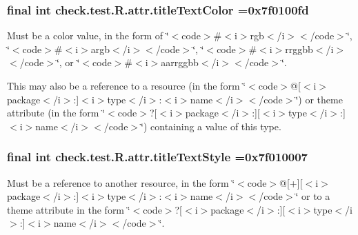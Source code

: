 \subsubsection[{title\+Text\+Color}]{\setlength{\rightskip}{0pt plus 5cm}final int check.\+test.\+R.\+attr.\+title\+Text\+Color =0x7f0100fd\hspace{0.3cm}{\ttfamily [static]}}\label{classcheck_1_1test_1_1_r_1_1attr_a05900c2c0b61d120064a083c8e2fcc8b}
Must be a color value, in the form of \char`\"{}$<$code$>$\#$<$i$>$rgb$<$/i$>$$<$/code$>$\char`\"{}, \char`\"{}$<$code$>$\#$<$i$>$argb$<$/i$>$$<$/code$>$\char`\"{}, \char`\"{}$<$code$>$\#$<$i$>$rrggbb$<$/i$>$$<$/code$>$\char`\"{}, or \char`\"{}$<$code$>$\#$<$i$>$aarrggbb$<$/i$>$$<$/code$>$\char`\"{}. 

This may also be a reference to a resource (in the form \char`\"{}$<$code$>$@\mbox{[}$<$i$>$package$<$/i$>$\+:\mbox{]}$<$i$>$type$<$/i$>$\+:$<$i$>$name$<$/i$>$$<$/code$>$\char`\"{}) or theme attribute (in the form \char`\"{}$<$code$>$?\mbox{[}$<$i$>$package$<$/i$>$\+:\mbox{]}\mbox{[}$<$i$>$type$<$/i$>$\+:\mbox{]}$<$i$>$name$<$/i$>$$<$/code$>$\char`\"{}) containing a value of this type. \hypertarget{classcheck_1_1test_1_1_r_1_1attr_a3132c1db5fe53bffcbde427849ea7bc8}{}
\subsubsection[{title\+Text\+Style}]{\setlength{\rightskip}{0pt plus 5cm}final int check.\+test.\+R.\+attr.\+title\+Text\+Style =0x7f010007\hspace{0.3cm}{\ttfamily [static]}}\label{classcheck_1_1test_1_1_r_1_1attr_a3132c1db5fe53bffcbde427849ea7bc8}
Must be a reference to another resource, in the form \char`\"{}$<$code$>$@\mbox{[}+\mbox{]}\mbox{[}$<$i$>$package$<$/i$>$\+:\mbox{]}$<$i$>$type$<$/i$>$\+:$<$i$>$name$<$/i$>$$<$/code$>$\char`\"{} or to a theme attribute in the form \char`\"{}$<$code$>$?\mbox{[}$<$i$>$package$<$/i$>$\+:\mbox{]}\mbox{[}$<$i$>$type$<$/i$>$\+:\mbox{]}$<$i$>$name$<$/i$>$$<$/code$>$\char`\"{}. \hypertarget{classcheck_1_1test_1_1_r_1_1attr_a115881f8837d9e7f7a0d617a81e74f0a}{}
